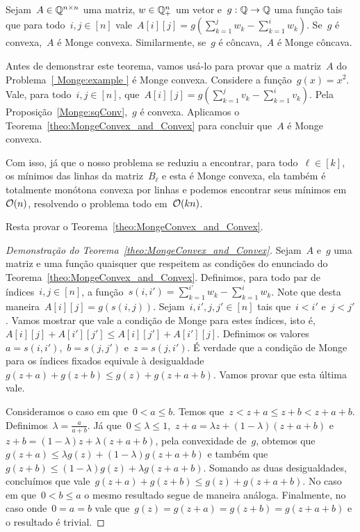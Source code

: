 \begin{theo} \label{theo:MongeConvex_and_Convex}
Sejam~$A \in \mathbb{Q}^{n \times n}$ uma matriz, $w \in \mathbb{Q}_+^n$ um vetor e~${g : \mathbb{Q} \to \mathbb{Q}}$ uma função tais que para todo~$i,j \in [n]$ vale~${A[i][j] = g\left(\sum\limits_{k=1}^j w_k - \sum\limits_{k=1}^i w_k\right)}$. Se~$g$ é convexa,~$A$ é Monge convexa. Similarmente, se~$g$ é côncava,~$A$ é Monge côncava.
\end{theo}

Antes de demonstrar este teorema, vamos usá-lo para provar que a matriz~$A$ do Problema~\ref{ Monge:example } é Monge convexa. Considere a função~$g(x) = x^2$. Vale, para todo~${ i,j \in [n] }$, que~${A[i][j] = g\left(\sum\limits_{k=1}^j v_k - \sum\limits_{k=1}^i v_k \right)}$. Pela Proposição~\ref{Monge:sqConv},~$g$ é convexa. Aplicamos o Teorema~\ref{theo:MongeConvex_and_Convex} para concluir que~$A$ é Monge convexa.

Com isso, já que o nosso problema se reduziu a encontrar, para todo~$\ell \in [k]$, os mínimos das linhas da matriz~$B_\ell$ e esta é Monge convexa, ela também é totalmente monótona convexa por linhas e podemos encontrar seus mínimos em~$\mathcal{O}(n)$, resolvendo o problema todo em~$\mathcal{O}(kn)$.

Resta provar o Teorema~\ref{theo:MongeConvex_and_Convex}.

\begin{proof}[Demonstração do Teorema~\ref{theo:MongeConvex_and_Convex}]
Sejam~$A$ e~$g$ uma matriz e uma função quaisquer que respeitem as condições do enunciado do Teorema~\ref{theo:MongeConvex_and_Convex}. Definimos, para todo par de índices~${ i,j \in [n] }$, a função~${ s(i,i') = \sum\limits_{k=1}^{i'} w_k - \sum\limits_{k=1}^i w_k }$. Note que desta maneira~${ A[i][j] = g(s(i,j)) }$. Sejam~${ i,i',j,j' \in [n] }$ tais que~${ i < i' }$ e~${ j < j' }$. Vamos mostrar que vale a condição de Monge para estes índices, isto é,~${ A[i][j] + A[i'][j'] \leq A[i][j'] + A[i'][j] }$. Definimos os valores~${ a = s(i,i') }$,~${ b = s(j,j') }$ e~${ z = s(j,i') }$. É verdade que a condição de Monge para os índices fixados equivale à desigualdade~${ g(z+a) + g(z+b) \leq g(z) + g(z+a+b) }$. Vamos provar que esta última vale.

Consideramos o caso em que~${ 0 < a \leq b }$. Temos que~${ z < z+a \leq z + b < z + a + b }$. Definimos~${ \lambda = \frac{a}{a+b} }$. Já que~${ 0 \leq \lambda \leq 1 }$,~${ z + a = \lambda z + (1 - \lambda)(z+a+b) }$ e~${ z + b = (1 - \lambda)z + \lambda(z+a+b) }$, pela convexidade de~$g$, obtemos que~${ g(z+a) \leq \lambda g(z) + (1 - \lambda)g(z+a+b) }$ e também que~${ g(z+b) \leq (1-\lambda) g(z) + \lambda g(z+a+b) }$. Somando as duas desigualdades, concluímos que vale~${ g(z+a) + g(z+b) \leq g(z) + g(z+a+b) }$. No caso em que~${ 0 < b \leq a }$ o mesmo resultado segue de maneira análoga. Finalmente, no caso onde~${ 0 = a = b }$ vale que~${ g(z) = g(z+a) = g(z+b) = g(z+a+b) }$ e o resultado é trivial.
\end{proof}

